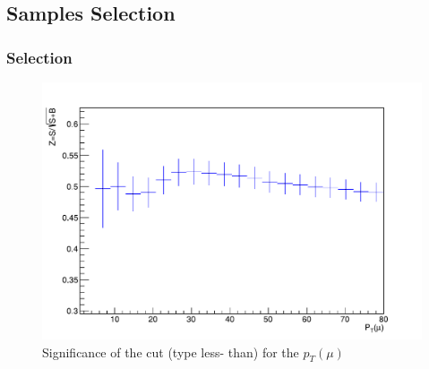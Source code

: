 \documentclass{beamer}
\begin{document}
\begin{frame}
\section{Samples Selection}
\frametitle{Selection}


\begin{figure}[!h]
	
\centering
\includegraphics[scale=0.45]{pictures/Selection/SigLT_P_Tmu}
\caption{Significance of the cut (type less-
	than) for the $p_T(\mu)$\label{}}

\end{figure}


\end{frame}
\end{document}
